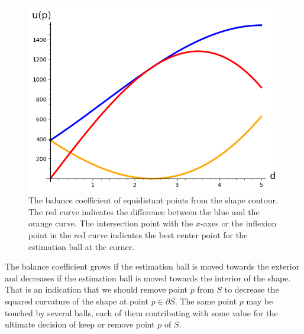 \begin{figure}[h!]
\begin{minipage}{0.25\textwidth}
\end{minipage}%
\begin{minipage}{0.75\textwidth}
\includegraphics[scale=0.75]{figures/chapter7/balance-coefficient-p2-with-sum.png}
\end{minipage}
\caption{The balance coefficient of equidistant points from the shape contour. The red curve indicates the difference between the blue and the orange curve. The intersection point with the $x$-axes or the inflexion point in the red curve indicates the best center point for the estimation ball at the corner. }
\label{fig:balance-plot}
\end{figure}


The balance coefficient grows if the estimation ball is moved towards the exterior and decreases if the estimation ball is moved towards the interior of the shape. That is an indication that we should remove point $p$ from $S$ to decrease the squared curvature of the shape at point $p \in \partial S$. The same point $p$ may be touched by several balls, each of them contributing with some value for the ultimate decision of keep or remove point $p$ of $S$. 


